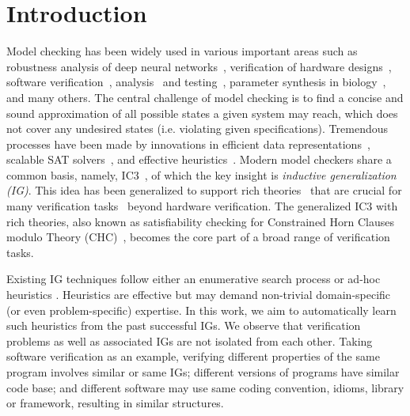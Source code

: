 
\section{Introduction}
\label{chap:intro}

Model checking has been widely used in various important areas such as robustness analysis of deep neural networks~\cite{Katz:cav19}, verification of hardware designs~\cite{SMC96}, software verification~\cite{Ball02}, analysis~\cite{ESC-java-02} and testing~\cite{Sheyner:SP02}, parameter synthesis in biology~\cite{Barnat:biology12}, and many others. 
The central challenge of model checking is to find a concise and sound approximation of all possible states a given system may reach, which does not cover any undesired states (i.e. violating given specifications). 
Tremendous processes have been made by innovations in efficient data representations~\cite{BDD}, scalable SAT solvers~\cite{CDCL,chaff,minisat}, and effective heuristics~\cite{CEGAR,BMC,McMillan:cav06}.  
Modern model checkers share a common basis, namely, IC3~\cite{IC3}, of which the key insight is \textit{inductive generalization (IG)}.
This idea has been generalized to support rich theories~\cite{GPDR} that are crucial for many verification tasks~\cite{Komuravelli:cav13,SeaHorn} beyond hardware verification. 
The generalized IC3 with rich theories, also known as satisfiability checking for Constrained Horn Clauses modulo Theory
(CHC)~\cite{DBLP:conf/birthday/BjornerGMR15}, becomes the core part of a broad range of verification tasks.



Existing IG techniques follow either an enumerative search process \cite{IC3,Bradley:fmcad11} or ad-hoc heuristics \cite{Griggio:CAD16,GSpacer}. 
Heuristics are effective but may demand non-trivial domain-specific (or even problem-specific) expertise. 
In this work, we aim to automatically learn such heuristics from the past successful IGs. 
We observe that verification problems as well as associated IGs are not isolated from each other. 
Taking software verification as an example, verifying different properties of the same program involves similar or same IGs; different versions of programs have similar code base; and
different software may use same coding convention, idioms, library or framework, resulting in similar structures.



